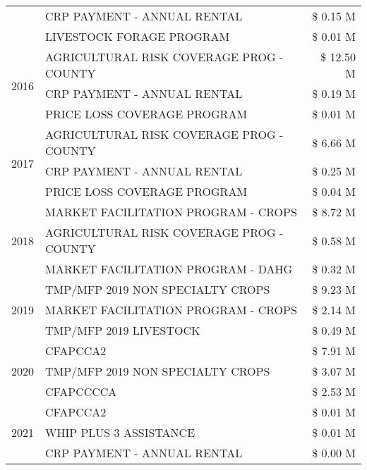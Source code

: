 \begin{tabular}{llr}
 & CRP PAYMENT - ANNUAL RENTAL & \$ 0.15 M \\
 & LIVESTOCK FORAGE PROGRAM & \$ 0.01 M \\
\cline{1-3}
\multirow[t]{3}{*}{2016} & AGRICULTURAL RISK COVERAGE PROG - COUNTY      & \$ 12.50 M \\
 & CRP PAYMENT - ANNUAL RENTAL                   & \$ 0.19 M \\
 & PRICE LOSS COVERAGE PROGRAM                   & \$ 0.01 M \\
\cline{1-3}
\multirow[t]{3}{*}{2017} & AGRICULTURAL RISK COVERAGE PROG - COUNTY & \$ 6.66 M \\
 & CRP PAYMENT - ANNUAL RENTAL & \$ 0.25 M \\
 & PRICE LOSS COVERAGE PROGRAM & \$ 0.04 M \\
\cline{1-3}
\multirow[t]{3}{*}{2018} & MARKET FACILITATION PROGRAM - CROPS & \$ 8.72 M \\
 & AGRICULTURAL RISK COVERAGE PROG - COUNTY & \$ 0.58 M \\
 & MARKET FACILITATION PROGRAM - DAHG & \$ 0.32 M \\
\cline{1-3}
\multirow[t]{3}{*}{2019} & TMP/MFP 2019 NON SPECIALTY CROPS & \$ 9.23 M \\
 & MARKET FACILITATION PROGRAM - CROPS & \$ 2.14 M \\
 & TMP/MFP 2019 LIVESTOCK & \$ 0.49 M \\
\cline{1-3}
\multirow[t]{3}{*}{2020} & CFAPCCA2 & \$ 7.91 M \\
 & TMP/MFP 2019 NON SPECIALTY CROPS & \$ 3.07 M \\
 & CFAPCCCCA & \$ 2.53 M \\
\cline{1-3}
\multirow[t]{3}{*}{2021} & CFAPCCA2 & \$ 0.01 M \\
 & WHIP PLUS 3 ASSISTANCE & \$ 0.01 M \\
 & CRP PAYMENT - ANNUAL RENTAL & \$ 0.00 M \\
\cline{1-3}
\bottomrule
\end{tabular}
